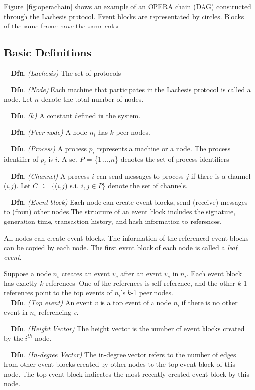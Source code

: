 \documentclass{article}
\newcommand{\dfnn}[2]{$\quad$\textbf{Dfn}. \emph{(#1)} {#2}}
\begin{document}
Figure~\ref{fig:operachain} shows an example of an OPERA chain (DAG) constructed through the Lachesis protocol. Event blocks are representated by circles. Blocks of the same frame have the same color.

\subsection{Basic Definitions}

\dfnn{Lachesis}{The set of protocols}

\dfnn{Node}{Each machine that participates in the Lachesis protocol is called a node. Let $n$ denote the total number of nodes.}

\dfnn{$k$}{A constant defined in the system.}

\dfnn{Peer node}{A node $n_i$ has $k$ peer nodes.}

\dfnn{Process}{A process $p_i$ represents a machine or a node. The process identifier of $p_i$ is $i$. A set $P$ = \{1,...,$n$\} denotes the set of process identifiers.}

\dfnn{Channel}{ A process $i$ can send messages to process $j$ if there is a channel ($i$,$j$). Let $C$ $\subseteq$ \{($i$,$j$) s.t. $i,j \in P$\} denote the set of channels.}

\dfnn{Event block}{Each node can create event blocks, send (receive) messages to (from) other nodes.The structure of an event block includes the signature, generation time, transaction history, and hash information to references.}

 All nodes can create event blocks. The information of the referenced event blocks can be copied by each node. The first event block of each node is called a \emph{leaf event}.
 
Suppose a node $n_i$ creates an event $v_c$ after an event $v_s$ in $n_i$.  Each event block has exactly $k$ references. One of the references is self-reference, and the other $k$-1 references point to the top events of $n_i$'s $k$-1 peer nodes.\\

\dfnn{Top event}{An event $v$ is a top event of a node $n_i$ if there is no other event in $n_i$ referencing $v$.}

\dfnn{Height Vector}{The height vector is the number of event blocks created by the $i^{th}$ node.}

\dfnn{In-degree Vector}{The in-degree vector refers to the number of edges from other event blocks created by other nodes to the top event block of this node. The top event block indicates the most recently created event block by this node.}
\end{document}
